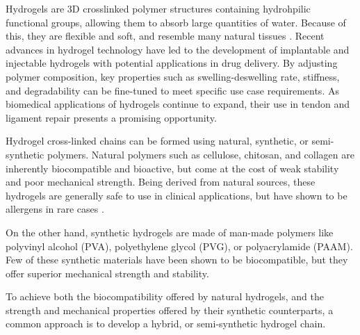 Hydrogels are 3D crosslinked polymer structures containing hydrohpilic functional groups, allowing them to absorb large quantities of water. Because of this, they are flexible and soft, and resemble many natural tissues \autocite{hoHydrogelsPropertiesApplications2022}.
Recent advances in hydrogel technology have led to the development of implantable and injectable hydrogels with potential applications in drug delivery. By adjusting polymer composition, key properties such as swelling-deswelling rate, stiffness, and degradability can be fine-tuned to meet specific use case requirements. As biomedical applications of hydrogels continue to expand, their use in tendon and ligament repair presents a promising opportunity.

Hydrogel cross-linked chains can be formed using natural, synthetic, or semi-synthetic polymers. Natural polymers such as cellulose, chitosan, and collagen are inherently biocompatible and bioactive, but come at the cost of weak stability and poor mechanical strength. Being derived from natural sources, these hydrogels are generally safe to use in clinical applications, but have shown to be allergens in rare cases \autocite{hoHydrogelsPropertiesApplications2022}.

On the other hand, synthetic hydrogels are made of man-made polymers like polyvinyl alcohol (PVA), polyethylene glycol (PVG), or polyacrylamide (PAAM). Few of these synthetic materials have been shown to be biocompatible, but they offer superior mechanical strength and stability.

To achieve both the biocompatibility offered by natural hydrogels, and the strength and mechanical properties offered by their synthetic counterparts, a common approach is to develop a hybrid, or semi-synthetic hydrogel chain. 
